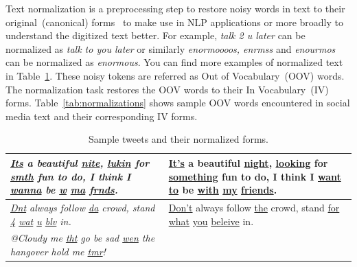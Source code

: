 \documentclass[a4paper,onesided,12pt]{report}
\begin{document}
Text normalization is a preprocessing step to restore noisy words in text to their original~(canonical) forms~\cite{Han:2011:LNS:2002472.2002520} to make use in NLP applications or more broadly to understand the digitized text better. For example, \textit{talk 2 u later} can be normalized as \textit{talk to you later} or similarly \textit{enormoooos, enrmss} and \textit{enourmos} can be normalized as \textit{enormous}. You can find more examples of normalized text in Table~\ref{tab:sentences}. These noisy tokens are referred as Out of Vocabulary~(OOV) words. The normalization task restores the OOV words to their In Vocabulary~(IV) forms. Table~\ref{tab:normalizations} shows sample OOV words encountered in social media text and their corresponding IV forms.


\begin{table}[hbp]
\caption[Sample tweets and their normalized forms.]{Sample tweets and their normalized forms.}
\label{tab:sentences}
\begin{tabular}{|>{\itshape}p{7cm}|p{7cm}|}
\hline
\underline{Its} a beautiful \underline{nite}, \underline{lukin} for \underline{smth} fun to do, I think I \underline{wanna} be \underline{w} \underline{ma} \underline{frnds}. &
\underline{It’s} a beautiful \underline{night}, \underline{looking} for \underline{something} fun to do, I think I \underline{want to} be \underline{with} \underline{my} \underline{friends}. \\
\hline
\underline{Dnt} always follow \underline{da} crowd, stand \underline{4} \underline{wat} \underline{u} \underline{blv} in. &
\underline{Don't} always follow \underline{the} crowd, stand \underline{for} \underline{what} \underline{you} \underline{beleive} in. \\
\hline
@Cloudy me \underline{tht} go be sad \underline{wen} the hangover hold me \underline{tmr}! &


\end{tabular}
\end{table}
\end{document}
